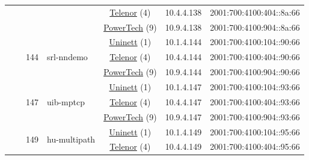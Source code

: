 \begin{small}
\begin{center}
\begin{longtable}{|c|c|c|c|c|c|c|c|}
  &  &  &  & \multicolumn{2}{|c|}{\tiny{\href{https://www.telenor.no}{Telenor} (4)}} & \tiny{10.4.4.138} & \tiny{2001:700:4100:404::8a:66} \\* \cline{5-5}\cline{6-6}\cline{7-7}\cline{8-8}
  &  &  &  & \multicolumn{2}{|c|}{\tiny{\href{http://www.powertech.no}{PowerTech} (9)}} & \tiny{10.9.4.138} & \tiny{2001:700:4100:904::8a:66} \\* \cline{3-3}\cline{4-4}\cline{5-5}\cline{6-6}\cline{7-7}\cline{8-8}
  &  & \multirow{3}{*}{\tiny{144}} & \multicolumn{1}{|l|}{\multirow{3}{*}{\tiny{srl-nndemo}}} & \multicolumn{2}{|c|}{\tiny{\href{https://www.uninett.no}{Uninett} (1)}} & \tiny{10.1.4.144} & \tiny{2001:700:4100:104::90:66} \\* \cline{5-5}\cline{6-6}\cline{7-7}\cline{8-8}
  &  &  &  & \multicolumn{2}{|c|}{\tiny{\href{https://www.telenor.no}{Telenor} (4)}} & \tiny{10.4.4.144} & \tiny{2001:700:4100:404::90:66} \\* \cline{5-5}\cline{6-6}\cline{7-7}\cline{8-8}
  &  &  &  & \multicolumn{2}{|c|}{\tiny{\href{http://www.powertech.no}{PowerTech} (9)}} & \tiny{10.9.4.144} & \tiny{2001:700:4100:904::90:66} \\* \cline{3-3}\cline{4-4}\cline{5-5}\cline{6-6}\cline{7-7}\cline{8-8}
  &  & \multirow{3}{*}{\tiny{147}} & \multicolumn{1}{|l|}{\multirow{3}{*}{\tiny{uib-mptcp}}} & \multicolumn{2}{|c|}{\tiny{\href{https://www.uninett.no}{Uninett} (1)}} & \tiny{10.1.4.147} & \tiny{2001:700:4100:104::93:66} \\* \cline{5-5}\cline{6-6}\cline{7-7}\cline{8-8}
  &  &  &  & \multicolumn{2}{|c|}{\tiny{\href{https://www.telenor.no}{Telenor} (4)}} & \tiny{10.4.4.147} & \tiny{2001:700:4100:404::93:66} \\* \cline{5-5}\cline{6-6}\cline{7-7}\cline{8-8}
  &  &  &  & \multicolumn{2}{|c|}{\tiny{\href{http://www.powertech.no}{PowerTech} (9)}} & \tiny{10.9.4.147} & \tiny{2001:700:4100:904::93:66} \\* \cline{3-3}\cline{4-4}\cline{5-5}\cline{6-6}\cline{7-7}\cline{8-8}
  &  & \multirow{3}{*}{\tiny{149}} & \multicolumn{1}{|l|}{\multirow{3}{*}{\tiny{hu-multipath}}} & \multicolumn{2}{|c|}{\tiny{\href{https://www.uninett.no}{Uninett} (1)}} & \tiny{10.1.4.149} & \tiny{2001:700:4100:104::95:66} \\* \cline{5-5}\cline{6-6}\cline{7-7}\cline{8-8}
  &  &  &  & \multicolumn{2}{|c|}{\tiny{\href{https://www.telenor.no}{Telenor} (4)}} & \tiny{10.4.4.149} & \tiny{2001:700:4100:404::95:66} \\* \cline{5-5}\cline{6-6}\cline{7-7}\cline{8-8}

\end{longtable}
\end{center}
\end{small}
